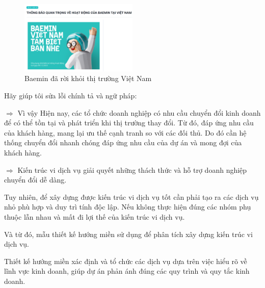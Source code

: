 \begin{figure}[H]

\centering

\includegraphics[width = 0.5\textwidth]{pictures/Baemin/main.png}

\caption{Baemin đã rời khỏi thị trường Việt Nam}

\end{figure}

Hãy giúp tôi sửa lỗi chính tả và ngữ pháp:

$\Rightarrow$ Vì vậy Hiện nay, các tổ chức doanh nghiệp có nhu cầu   chuyển đổi kinh doanh để có thể tồn tại và phát triển khi thị trường thay đổi. Từ đó, đáp ứng nhu cầu của khách hàng,    mang lại  ưu thế cạnh tranh so với các đối thủ. Do đó cần hệ thống chuyển đổi nhanh chóng đáp ứng nhu cầu của dự án và mong đợi của khách hàng.

$\Rightarrow$ Kiến trúc vi dịch vụ giải quyết những thách thức và hỗ trợ doanh nghiệp chuyển đổi dễ dàng.


Tuy nhiên, để xây dựng được kiến trúc vi dịch vụ tốt cần phải tạo ra các dịch vụ nhỏ phù hợp và duy trì tính độc lập. Nếu không thực hiện đúng các nhóm phụ thuộc lẫn nhau và mất đi lợi thế của kiến trúc vi dịch vụ.

Và từ đó, mẫu thiết kế hướng miền sử dụng để phân tích xây dựng kiến trúc vi dịch vụ.

Thiết kế hướng miền xác định và tổ chức các dịch vụ dựa trên việc hiểu rõ về lĩnh vực kinh doanh, giúp dự án phản ánh đúng các quy trình và quy tắc kinh doanh.





